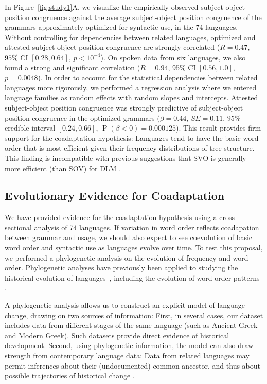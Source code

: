 \documentclass[9pt,twocolumn,twoside,lineno]{pnas-new}
\begin{document}
In Figure~\ref{fig:study1}A, we visualize the empirically observed subject-object position congruence against the average subject-object position congruence of the grammars  approximately optimized for syntactic use, in the 74 languages.
Without controlling for dependencies between related languages, optimized and attested subject-object position congruence are strongly correlated ($R=0.47$, $95\%$ CI $[0.28, 0.64]$, $p<10^{-4}$). %
On spoken data from six languages, we also found a strong and significant correlation ($R=0.94$, 95\% CI $[0.56, 1.0]$, $p=0.0048$).
In order to account for the statistical dependencies between related languages more rigorously, we performed a regression analysis where we entered language families as random effects with random slopes and intercepts.
Attested subject-object position congruence was strongly predictive of subject-object position congruence in the optimized grammars ($\beta = 0.44$, $SE=0.11$, $95\%$ credible interval $[0.24, 0.66]$, $\operatorname{P}(\beta<0) = 0.000125$). %
This result provides firm support for the coadaptation hypothesis: Languages tend to have the basic word order that is most efficient given their frequency distributions of tree structure.
This finding is incompatible with previous suggestions that SVO is generally more efficient (than SOV) for DLM \citep{ferrer-i-cancho-placement-2017}.







\subsection*{Evolutionary Evidence for Coadaptation}
We have provided evidence for the coadaptation hypothesis using a cross-sectional analysis of 74 languages. %
If variation in word order reflects coadapation between grammar and usage, we should also expect to see coevolution of basic word order and syntactic use as languages evolve over time.
To test this proposal, we performed a phylogenetic analysis on the evolution of frequency and word order.
Phylogenetic analyses have previously been applied to studying the historical evolution of languages~\citep[e.g., ][]{gray2009language,greenhill2009austronesian,chang2015ancestry,sagart2019dated}, including the evolution of word order patterns \citep{dunn-evolved-2011, maurits2014tracing}.


A phylogenetic analysis allows us to construct an explicit model of language change, drawing on two sources of information:
First, in several cases, our dataset includes data from different stages of the same language (such as Ancient Greek and Modern Greek).
Such datasets provide direct evidence of historical development.
Second, using phylogenetic information, the model can also draw strength from contemporary language data:
Data from related languages may permit inferences about their (undocumented) common ancestor, and thus about possible trajectories of historical change \citep{pagel2004bayesian, dunn-evolved-2011, maurits2014tracing}.
\end{document}
